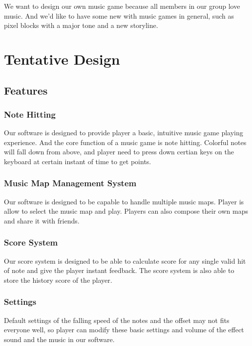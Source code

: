 \documentclass[12pt, a4paper]{article}
\begin{document}
We want to design our own music game because all members in our group love music.
And we'd like to have some new with music games in general, such as pixel blocks with a major tone and a new storyline.

\section{Tentative Design}

\subsection{Features}

\subsubsection{Note Hitting}

Our software is designed to provide player a basic, intuitive
music game playing experience. And the core function of a music game
is note hitting. Colorful notes will fall down from above, and player
need to press down certian keys on the keyboard at certain instant of time
to get points.

\subsubsection{Music Map Management System}

Our software is designed to be capable to handle multiple music maps.
Player is allow to select the music map and play. Players can also
compose their own maps and share it with friends.

\subsubsection{Score System}

Our score system is designed to be able to calculate score for any single
valid hit of note and give the player instant feedback. The score system
is also able to store the history score of the player.

\subsubsection{Settings}

Default settings of the falling speed of the notes and the offset may not
fits everyone well, so player can modify these basic settings and volume
of the effect sound and the music in our software.
\end{document}
